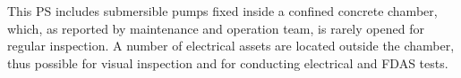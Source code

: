 
This PS includes submersible pumps fixed inside a confined concrete chamber, which, as reported by maintenance and operation team, is rarely opened for regular inspection. A number of electrical assets are located outside the chamber, thus possible for visual inspection and for conducting electrical and FDAS tests.


